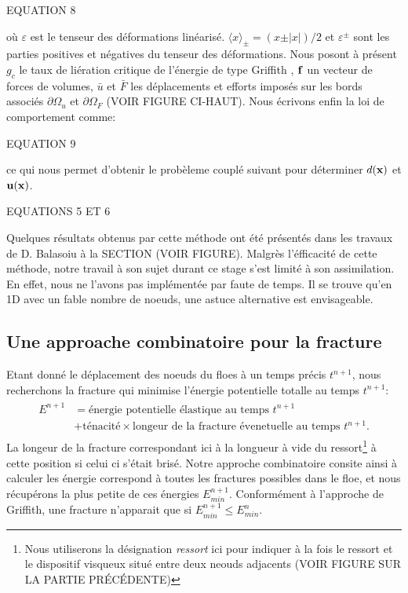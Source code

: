 EQUATION 8

où $\varepsilon$ est le tenseur des déformations linéarisé. $\langle x\rangle_{\pm} = (x \pm \vert x \vert) / 2$ et $\varepsilon^{\pm}$ sont les parties positives et négatives du tenseur des déformations. Nous posont à présent $g_c$ le taux de liération critique de l'énergie de type Griffith \parencite[p.5]{miehe2010phase}, $\bm{\mathrm{f}}$ un vecteur de forces de volumes, $\bar{u}$ et $\bar{F}$ les déplacements et efforts imposés sur les bords associés $\partial \Omega_u$ et $\partial \Omega_F$ (VOIR FIGURE CI-HAUT). Nous écrivons enfin la loi de comportement comme:

EQUATION 9

ce qui nous permet d'obtenir le probèleme couplé suivant pour déterminer $d(\bm{\mathrm{x}})$ et $\bm{\mathrm{u}}(\bm{\mathrm{x}})$.

EQUATIONS 5 ET 6


Quelques résultats obtenus par cette méthode ont été présentés dans les travaux de D. Balasoiu à la SECTION (VOIR FIGURE). Malgrès l'éfficacité de cette méthode, notre travail à son sujet durant ce stage s'est limité à son assimilation. En effet, nous ne l'avons pas implémentée par faute de temps. Il se trouve qu'en 1D avec un fable nombre de noeuds, une astuce alternative est envisageable. 




\subsection{Une approache combinatoire pour la fracture}
\label{subsubsec:approchecombi}


Etant donné le déplacement des noeuds du floes à un temps précis $t^{n+1}$, nous recherchons la fracture qui minimise l'énergie potentielle totalle au temps $t^{n+1}$:
\begin{align}
    \boxed{
    \begin{array}{rcl}
    E^{n+1} & = \text{énergie potentielle élastique au temps } t^{n+1}  \\
    & + \text{ténacité}\times \text{longeur de la fracture évenetuelle au temps }t^{n+1}.  
    \end{array}
    }
\end{align}
La longeur de la fracture correspondant ici à la longueur à vide du ressort\footnote{Nous utiliserons la désignation \emph{ressort} ici pour indiquer à la fois le ressort et le dispositif visqueux situé entre deux neouds adjacents (VOIR FIGURE SUR LA PARTIE PRÉCÉDENTE)} à cette position si celui ci s'était brisé. Notre approche combinatoire consite ainsi à calculer les énergie correspond à toutes les fractures possibles dans le floe, et nous récupérons la plus petite de ces énergies $E^{n+1}_{min}$. Conformément à l'approche de Griffith, une fracture n'apparait que si $E^{n+1}_{min}\leq E^{n}_{min}$.

